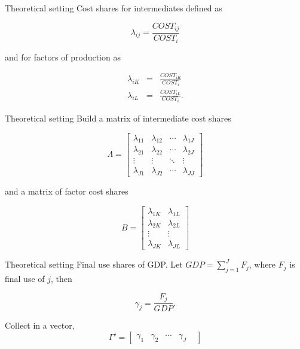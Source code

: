 \documentclass[10pt,xcolor=dvipsnames]{beamer}
\begin{document}
\begin{frame}{Theoretical setting}
Cost shares for intermediates defined as

\begin{equation}
  \lambda_{ij} = \frac{COST_{ij}}{COST_i}
\end{equation}

and for factors of production as 

\begin{eqnarray}
  \lambda_{iK} &=& \frac{COST_{iK}}{COST_i} \\
  \lambda_{iL} &=& \frac{COST_{iL}}{COST_i}.
\end{eqnarray}

\end{frame}

\begin{frame}{Theoretical setting}
Build a matrix of intermediate cost shares

\begin{equation}
  \Lambda = 
  \begin{bmatrix}
    \lambda_{11} & \lambda_{12} & \cdots & \lambda_{1J} \\
    \lambda_{21} & \lambda_{22} & \cdots & \lambda_{2J} \\
    \vdots       & \vdots       & \ddots & \vdots       \\
    \lambda_{J1} & \lambda_{J2} & \cdots & \lambda_{JJ}
  \end{bmatrix}
\end{equation}

and a matrix of factor cost shares

\begin{equation}
  B = 
  \begin{bmatrix}
    \lambda_{1K} & \lambda_{1L} \\
    \lambda_{2K} & \lambda_{2L} \\
    \vdots       & \vdots       \\
    \lambda_{JK} & \lambda_{JL}
  \end{bmatrix}
\end{equation}

\end{frame}

\begin{frame}{Theoretical setting}
Final use shares of GDP. Let $GDP = \sum_{j=1}^J F_j$, where $F_j$ is final use of $j$, then

\begin{equation}
  \gamma_j = \frac{F_j}{GDP}.
\end{equation}

Collect in a vector,
\begin{equation}
  \Gamma' = 
  \begin{bmatrix}
    \gamma_1 &
    \gamma_2 &
    \cdots &
    \gamma_J &
  \end{bmatrix}
\end{equation}

\end{frame}
\end{document}
